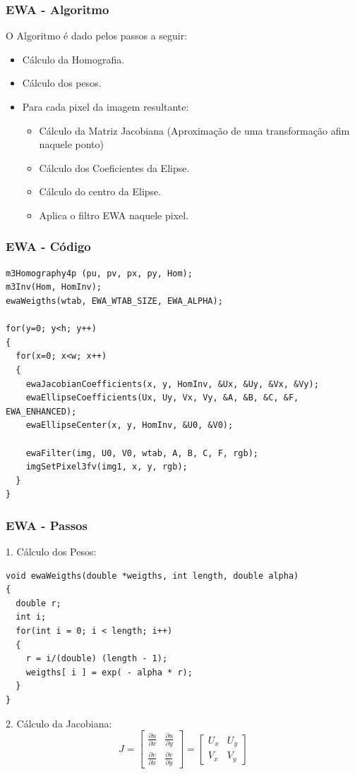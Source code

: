 \documentclass{beamer}
\begin{document}
\begin{frame}[fragile]
\frametitle{EWA - Algoritmo}
O Algoritmo é dado pelos passos a seguir:
\begin{itemize}
 \item Cálculo da Homografia.
 \item Cálculo dos pesos.
 \item Para cada pixel da imagem resultante:
 \begin{itemize}
  \item Cálculo da Matriz Jacobiana (Aproximação de uma transformação afim
naquele ponto)
  \item Cálculo dos Coeficientes da Elipse.
  \item Cálculo do centro da Elipse.
  \item Aplica o filtro EWA naquele pixel.
 \end{itemize}
\end{itemize}
\end{frame}

\begin{frame}[fragile]
 \frametitle{EWA - Código}
\tiny
\begin{lstlisting}
m3Homography4p (pu, pv, px, py, Hom);
m3Inv(Hom, HomInv);
ewaWeigths(wtab, EWA_WTAB_SIZE, EWA_ALPHA);

for(y=0; y<h; y++)
{
  for(x=0; x<w; x++)
  {
    ewaJacobianCoefficients(x, y, HomInv, &Ux, &Uy, &Vx, &Vy);
    ewaEllipseCoefficients(Ux, Uy, Vx, Vy, &A, &B, &C, &F, EWA_ENHANCED);
    ewaEllipseCenter(x, y, HomInv, &U0, &V0);

    ewaFilter(img, U0, V0, wtab, A, B, C, F, rgb);
    imgSetPixel3fv(img1, x, y, rgb);
  }
}
\end{lstlisting}
\end{frame}

\begin{frame}[fragile]
 \frametitle{EWA - Passos}
1. Cálculo dos Pesos:
\tiny
\begin{lstlisting}
void ewaWeigths(double *weigths, int length, double alpha)
{
  double r;
  int i;
  for(int i = 0; i < length; i++)
  {
    r = i/(double) (length - 1);
    weigths[ i ] = exp( - alpha * r);
  }
}
\end{lstlisting}

\pause
\small
2. Cálculo da Jacobiana:
\[
J=\left[ \begin{array}{cc}
\frac{\partial u}{\partial x} & \frac{\partial u}{\partial y} \\
\frac{\partial v}{\partial x} & \frac{\partial v}{\partial y} 
\end{array}
\right]
= 
\left[ \begin{array}{cc}
U_x & U_y \\
V_x & V_y 
\end{array}
\right]
\]
\end{frame}
\end{document}
